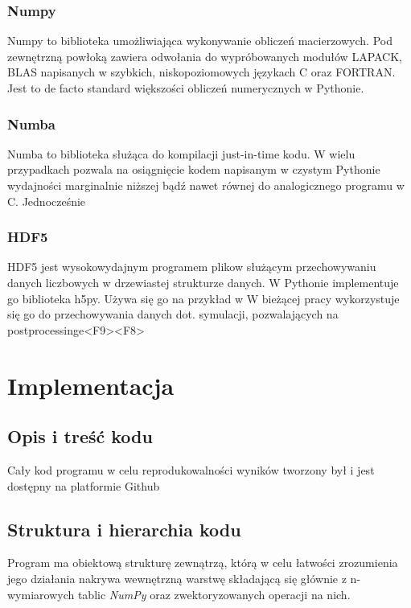 \subsubsection{Numpy}
Numpy to biblioteka umożliwiająca wykonywanie obliczeń macierzowych. Pod zewnętrzną powłoką zawiera odwołania do
wypróbowanych modułów LAPACK, BLAS %
napisanych w szybkich, niskopoziomowych językach C oraz FORTRAN. Jest to de facto standard większości obliczeń
numerycznych w Pythonie.
\subsubsection{Numba}
Numba to biblioteka służąca do kompilacji just-in-time kodu. %
W wielu przypadkach %
pozwala na osiągnięcie kodem napisanym w czystym Pythonie wydajności marginalnie niższej bądź nawet równej do analogicznego
programu w C. %
Jednocześnie 
\subsubsection{HDF5}
HDF5 jest wysokowydajnym programem plikow służącym przechowywaniu danych liczbowych w drzewiastej strukturze danych.
W Pythonie implementuje go biblioteka h5py.
Używa się go na przykład w %
W bieżącej pracy  wykorzystuje się go do przechowywania danych dot. symulacji, pozwalających na postprocessinge<F9><F8>

\section[Implementacja]{Implementacja}%
\subsection{Opis i treść kodu}
Cały kod programu w celu reprodukowalności wyników tworzony był i jest dostępny na platformie Github %

\subsection{Struktura i hierarchia kodu}

Program ma obiektową strukturę zewnątrzą, którą w celu łatwości zrozumienia jego działania nakrywa wewnętrzną warstwę
składającą się głównie z n-wymiarowych tablic \emph{NumPy} oraz zwektoryzowanych operacji na nich.

